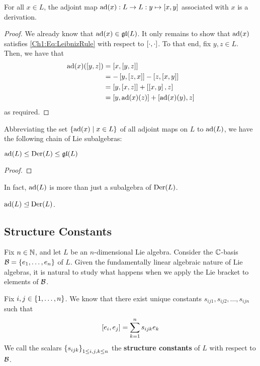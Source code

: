 \begin{boxproposition}
    For all $x \in L$, the adjoint map $\operatorname{ad}\!\left( x \right) : L \to L : y \mapsto \left[ x, y \right]$ associated with $x$ is a derivation.
\end{boxproposition}
\begin{proof}
    We already know that $\operatorname{ad}\!\left( x \right) \in \mathfrak{gl}\!\left( L \right)$. It only remains to show that $\operatorname{ad}\!\left( x \right)$ satisfies \eqref{Ch1:Eq:LeibnizRule} with respect to $\left[ \cdot, \cdot \right]$. To that end, fix $y, z \in L$. Then, we have that
    \begin{align*}
        \operatorname{ad}\!\left( x \right)\!\left( \left[ y, z \right] \right)
        &= \left[ x, \left[ y, z \right] \right] \\
        &= - \left[ y, \left[ z, x \right] \right] - \left[ z, \left[ x, y \right] \right] \\
        &= \left[ y, \left[ x, z \right] \right] + \left[ \left[ x, y \right], z \right] \\
        &= \left[ y, \operatorname{ad}\!\left( x \right)\!(z) \right] + \left[ \operatorname{ad}\!\left( x \right)\!(y), z \right]
    \end{align*}
    as required.
\end{proof}

Abbreviating the set $\left\{ \operatorname{ad}\!\left( x \right) \; \middle\vert \; x \in L \right\}$ of all adjoint maps on $L$ to $\operatorname{ad}\!\left( L \right)$, we have the following chain of Lie subalgebras:

\begin{boxlemma}\label{Ch1:Lemma:adSubalgDer}
    $\operatorname{ad}\!\left( L \right) \leq \operatorname{Der}\!\left( L \right) \leq \mathfrak{gl}\!\left( L \right)$
\end{boxlemma}
\begin{proof}
    \sorry
\end{proof}

In fact, $\operatorname{ad}\!\left( L \right)$ is more than just a subalgebra of $\operatorname{Der}\!\left( L \right)$.

\begin{boxlemma}
    $\operatorname{ad}\!\left( L \right) \trianglelefteq \operatorname{Der}\!\left( L \right)$.
\end{boxlemma}

\subsection{Structure Constants}

Fix $n \in \mathbb{N}$, and let $L$ be an $n$-dimensional Lie algebra. Consider the $\mathbb{C}$-basis $\mathcal{B} = \left\{ e_1, \ldots, e_n \right\}$ of $L$. Given the fundamentally linear algebraic nature of Lie algebras, it is natural to study what happens when we apply the Lie bracket to elements of $\mathcal{B}$.

\begin{boxdefinition}
    Fix $i, j \in \left\{ 1, \ldots, n \right\}$. We know that there exist unique constants $s_{ij1}, s_{ij2}, \ldots, s_{ijn}$ such that
    \begin{align*}
        \left[ e_i, e_j \right] = \sum_{k = 1}^{n} s_{ijk} e_k
    \end{align*}
    We call the scalars $\left\{ s_{ijk} \right\}_{1 \leq i, j, k \leq n}$ the \textbf{structure constants} of $L$ with respect to $\mathcal{B}$.
\end{boxdefinition}

